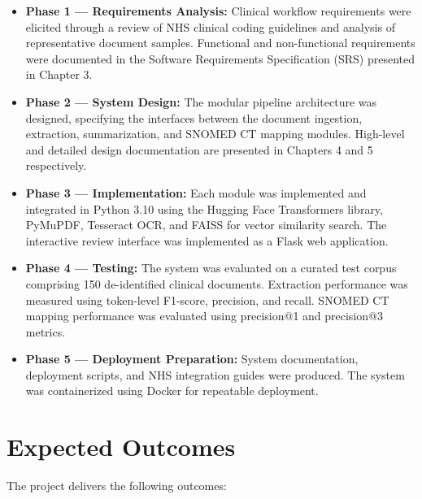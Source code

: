 \begin{itemize}
    \item \textbf{Phase 1 --- Requirements Analysis:} Clinical workflow requirements were elicited through a review of NHS clinical coding guidelines and analysis of representative document samples. Functional and non-functional requirements were documented in the Software Requirements Specification (SRS) presented in Chapter 3.

    \item \textbf{Phase 2 --- System Design:} The modular pipeline architecture was designed, specifying the interfaces between the document ingestion, extraction, summarization, and SNOMED CT mapping modules. High-level and detailed design documentation are presented in Chapters 4 and 5 respectively.

    \item \textbf{Phase 3 --- Implementation:} Each module was implemented and integrated in Python 3.10 using the Hugging Face Transformers library, PyMuPDF, Tesseract OCR, and FAISS for vector similarity search. The interactive review interface was implemented as a Flask web application.

    \item \textbf{Phase 4 --- Testing:} The system was evaluated on a curated test corpus comprising 150 de-identified clinical documents. Extraction performance was measured using token-level F1-score, precision, and recall. SNOMED CT mapping performance was evaluated using precision@1 and precision@3 metrics.

    \item \textbf{Phase 5 --- Deployment Preparation:} System documentation, deployment scripts, and NHS integration guides were produced. The system was containerized using Docker for repeatable deployment.
\end{itemize}


\section{Expected Outcomes}

The project delivers the following outcomes:

